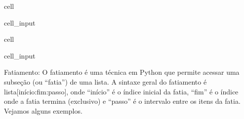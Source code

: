 \documentclass[letterpaper,10pt,english]{jupyterBook}
\begin{document}
\begin{sphinxuseclass}{cell}\begin{sphinxVerbatimInput}

\begin{sphinxuseclass}{cell_input}
\begin{sphinxVerbatim}[commandchars=\\\{\}]
      
  \PYG{p}{[}  \PYG{p}{]}
  \PYG{p}{[}\PYG{p}{]}
  
\end{sphinxVerbatim}

\end{sphinxuseclass}\end{sphinxVerbatimInput}

\end{sphinxuseclass}
\begin{sphinxuseclass}{cell}\begin{sphinxVerbatimInput}

\begin{sphinxuseclass}{cell_input}
\begin{sphinxVerbatim}[commandchars=\\\{\}]
  \PYG{p}{[}\PYG{p}{]}
  
\end{sphinxVerbatim}

\end{sphinxuseclass}\end{sphinxVerbatimInput}

\end{sphinxuseclass}
\sphinxAtStartPar
Fatiamento:
O fatiamento é uma técnica em Python que permite acessar uma subseção (ou “fatia”) de uma lista. A sintaxe geral do fatiamento é lista{[}início:fim:passo{]}, onde “início” é o índice inicial da fatia, “fim” é o índice onde a fatia termina (exclusivo) e “passo” é o intervalo entre os itens da fatia. Vejamos alguns exemplos.
\end{document}
